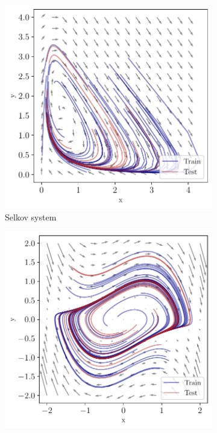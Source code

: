 \documentclass{article}
\theoremstyle{definition} \newtheorem{definition}{Definition}  \newtheorem{example}{Example}
\theoremstyle{remark} \newtheorem{remark}{Remark}
\begin{document}

\begin{figure}[htbp]
    \centering
    \begin{subfigure}[b]{0.48\linewidth}
        \centering
        \includegraphics[width=\linewidth]{selkov_vf_trajs}
        \caption{Selkov system}
        \label{fig:selkov_vf_trajs}
    \end{subfigure}
    \hfill
    \begin{subfigure}[b]{0.48\linewidth}
        \centering
        \includegraphics[width=\linewidth]{lienard_vf_trajs}

\end{subfigure}
\end{figure}
\end{document}
